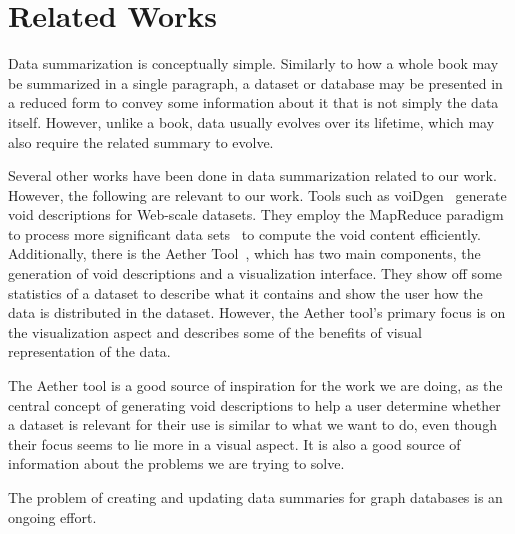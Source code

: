 \section{Related Works}\label{sec:related-works}
Data summarization is conceptually simple. Similarly to how a whole book may be summarized in a single paragraph, a dataset or database may be presented in a reduced form to convey some information about it that is not simply the data itself. However, unlike a book, data usually evolves over its lifetime, which may also require the related summary to evolve.

Several other works have been done in data summarization related to our work. However, the following are relevant to our work. Tools such as voiDgen~\cite{creating-void-descriptions} generate \gls{void} descriptions for Web-scale datasets. They employ the MapReduce paradigm to process more significant data sets~\cite{the-mapreduce-paradigm} to compute the \gls{void} content efficiently.
Additionally, there is the Aether Tool~\cite{aether-tool}, which has two main components, the generation of \gls{void} descriptions and a visualization interface. They show off some statistics of a dataset to describe what it contains and show the user how the data is distributed in the dataset. However, the Aether tool's primary focus is on the visualization aspect and describes some of the benefits of visual representation of the data.

The Aether tool is a good source of inspiration for the work we are doing, as the central concept of generating \gls{void} descriptions to help a user determine whether a dataset is relevant for their use is similar to what we want to do, even though their focus seems to lie more in a visual aspect. It is also a good source of information about the problems we are trying to solve.

The problem of creating and updating data summaries for graph databases is an ongoing effort.




